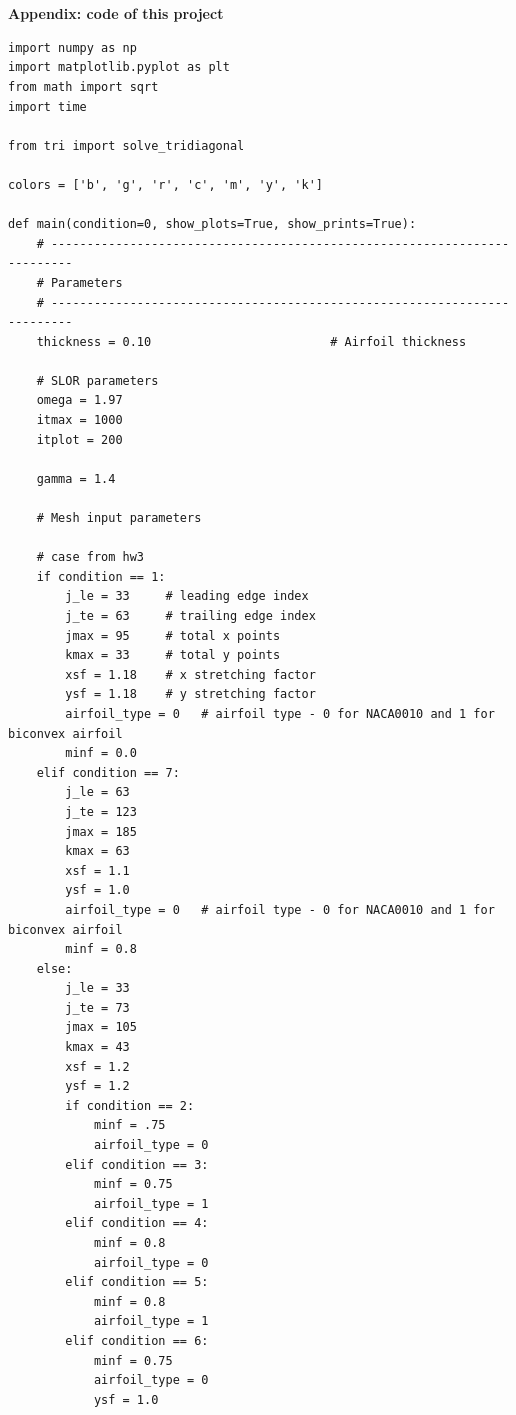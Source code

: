 \documentclass[12pt]{article}
\theoremstyle{definition}
\begin{document}
\vspace{1cm}



\noindent {\bf }\\

\vspace{1cm}



\noindent {\bf }\\

\vspace{1cm}


\newpage
\noindent \textbf{Appendix: code of this project}\\
\tiny
\begin{verbatim}
import numpy as np
import matplotlib.pyplot as plt
from math import sqrt
import time

from tri import solve_tridiagonal

colors = ['b', 'g', 'r', 'c', 'm', 'y', 'k']

def main(condition=0, show_plots=True, show_prints=True):
    # -------------------------------------------------------------------------
    # Parameters 
    # -------------------------------------------------------------------------
    thickness = 0.10                         # Airfoil thickness

    # SLOR parameters
    omega = 1.97
    itmax = 1000
    itplot = 200
    
    gamma = 1.4

    # Mesh input parameters
    
    # case from hw3
    if condition == 1:
        j_le = 33     # leading edge index
        j_te = 63     # trailing edge index
        jmax = 95     # total x points
        kmax = 33     # total y points
        xsf = 1.18    # x stretching factor
        ysf = 1.18    # y stretching factor
        airfoil_type = 0   # airfoil type - 0 for NACA0010 and 1 for biconvex airfoil
        minf = 0.0
    elif condition == 7:
        j_le = 63
        j_te = 123
        jmax = 185
        kmax = 63
        xsf = 1.1
        ysf = 1.0
        airfoil_type = 0   # airfoil type - 0 for NACA0010 and 1 for biconvex airfoil
        minf = 0.8
    else:
        j_le = 33
        j_te = 73
        jmax = 105
        kmax = 43
        xsf = 1.2
        ysf = 1.2
        if condition == 2:
            minf = .75
            airfoil_type = 0
        elif condition == 3:
            minf = 0.75
            airfoil_type = 1
        elif condition == 4:
            minf = 0.8
            airfoil_type = 0
        elif condition == 5:
            minf = 0.8
            airfoil_type = 1
        elif condition == 6:
            minf = 0.75
            airfoil_type = 0
            ysf = 1.0



\end{verbatim}
\end{document}

